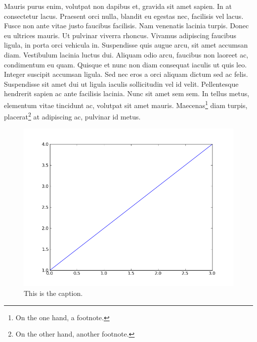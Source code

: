 \documentclass[letterpaper,compsoc,twoside,onecolumn]{IEEEtran}
\begin{document}
Mauris purus enim, volutpat non dapibus et, gravida sit amet sapien. In
at consectetur lacus. Praesent orci nulla, blandit eu egestas nec,
facilisis vel lacus. Fusce non ante vitae justo faucibus facilisis. Nam
venenatis lacinia turpis. Donec eu ultrices mauris. Ut pulvinar viverra
rhoncus. Vivamus adipiscing faucibus ligula, in porta orci vehicula in.
Suspendisse quis augue arcu, sit amet accumsan diam. Vestibulum lacinia
luctus dui. Aliquam odio arcu, faucibus non laoreet ac, condimentum eu
quam. Quisque et nunc non diam consequat iaculis ut quis leo. Integer
suscipit accumsan ligula. Sed nec eros a orci aliquam dictum sed ac
felis. Suspendisse sit amet dui ut ligula iaculis sollicitudin vel id
velit. Pellentesque hendrerit sapien ac ante facilisis lacinia. Nunc sit
amet sem sem. In tellus metus, elementum vitae tincidunt ac, volutpat
sit amet mauris. Maecenas\footnote{On the one hand, a footnote.} diam
turpis, placerat\footnote{On the other hand, another footnote.} at
adipiscing ac, pulvinar id metus.

\begin{figure}
\centering
\includegraphics{figure1.png}
\caption{This is the caption. \label{egfig}}
\end{figure}
\end{document}
